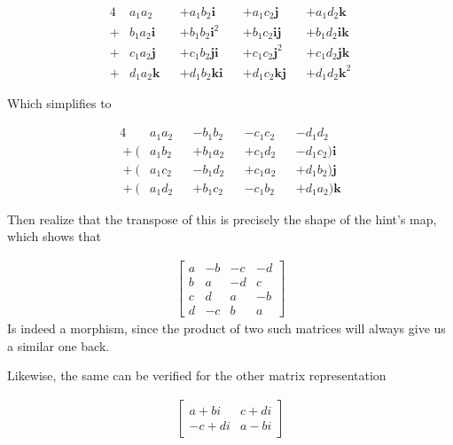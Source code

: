 \documentclass[12pt, twosided]{article}
\begin{document}
\begin{enumerate}
  \begin{alignat*}{4}
        &a_1a_2  &&+ a_1b_2 \mathbf i   &&+ a_1c_2 \mathbf j   &&+ a_1d_2 \mathbf k\\
  {}+{} &b_1a_2 \mathbf i &&+ b_1b_2 \mathbf i^2 &&+ b_1c_2 \mathbf{ij} &&+ b_1d_2 \mathbf{ik}\\
  {}+{} &c_1a_2 \mathbf j &&+ c_1b_2 \mathbf{ji} &&+ c_1c_2 \mathbf j^2 &&+ c_1d_2 \mathbf{jk}\\
  {}+{} &d_1a_2 \mathbf k &&+ d_1b_2 \mathbf{ki} &&+ d_1c_2 \mathbf{kj}  &&+ d_1d_2 \mathbf k^2
  \end{alignat*}

  Which simplifies to

  \begin{alignat*}{4}
          &a_1a_2 &&- b_1b_2 &&- c_1c_2 &&- d_1d_2\\
   {}+{} (&a_1b_2 &&+ b_1a_2 &&+ c_1d_2 &&- d_1c_2) \mathbf i\\
   {}+{} (&a_1c_2 &&- b_1d_2 &&+ c_1a_2 &&+ d_1b_2) \mathbf j\\
   {}+{} (&a_1d_2 &&+ b_1c_2 &&- c_1b_2 &&+ d_1a_2) \mathbf k
  \end{alignat*}

  Then realize that the transpose of this is precisely the shape of the hint's map, which shows that

  \begin{align*}
    \left[ \begin{array}{rrrr}
      a & -b & -c & -d \\ 
      b & a & -d & c \\
      c & d & a & -b \\
      d & -c & b & a 
    \end{array} \right]
  \end{align*}
  Is indeed a morphism, since the product of two such matrices will always give us a similar one back.

  Likewise, the same can be verified for the other matrix representation

  \begin{align*}
    \left[ \begin{array}{rr}  a+bi & c+di \\ -c + d i & a - b i \end{array} \right]
  \end{align*}


\end{enumerate}
\end{document}
